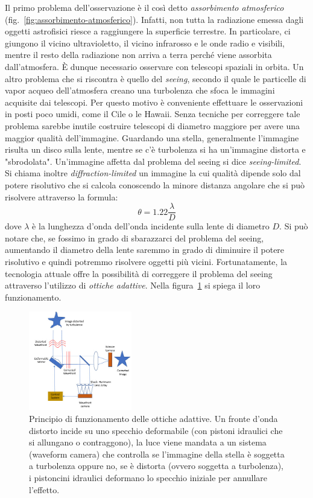 Il primo problema dell'osservazione è il così detto \emph{assorbimento atmosferico} (fig.~\ref{fig:assorbimento-atmosferico}). Infatti, non tutta la radiazione emessa dagli oggetti astrofisici riesce a raggiungere la superficie terrestre. In particolare, ci giungono il vicino ultravioletto, il vicino infrarosso e le onde radio e visibili, mentre il resto della radiazione non arriva a terra perché viene assorbita dall'atmosfera. È dunque necessario osservare con telescopi spaziali in orbita. Un altro problema che si riscontra è quello del \emph{seeing}, secondo il quale le particelle di vapor acqueo dell'atmosfera creano una turbolenza che sfoca le immagini acquisite dai telescopi. Per questo motivo è conveniente effettuare le osservazioni in posti poco umidi, come il Cile o le Hawaii. Senza tecniche per correggere tale problema sarebbe inutile costruire telescopi di diametro maggiore per avere una maggior qualità dell'immagine. Guardando una stella, generalmente l'immagine risulta un disco sulla lente, mentre se c'è turbolenza si ha un'immagine distorta e "sbrodolata". Un'immagine affetta dal problema del seeing si dice \emph{seeing-limited}. Si chiama inoltre \emph{diffraction-limited} un immagine la cui qualità dipende solo dal potere risolutivo che si calcola conoscendo la minore distanza angolare che si può risolvere attraverso la formula:
\[
    \theta = 1.22 \frac{\lambda}{D}
\]
dove $\lambda$ è la lunghezza d'onda dell'onda incidente sulla lente di diametro $D$. Si può notare che, se fossimo in grado di sbarazzarci del problema del seeing, aumentando il diametro della lente saremmo in grado di diminuire il potere risolutivo e quindi potremmo risolvere oggetti più vicini. Fortunatamente, la tecnologia attuale offre la possibilità di correggere il problema del seeing attraverso l'utilizzo di \emph{ottiche adattive}. Nella figura~\ref{fig:ottiche-adattive} si spiega il loro funzionamento. 

\begin{figure}
\centering
\includegraphics[width=0.4\textwidth]{immagini/ottiche-adattive.png}
\caption{Principio di funzionamento delle ottiche adattive. Un fronte d’onda distorto incide su uno specchio deformabile (con pistoni idraulici che si allungano o contraggono), la luce viene mandata a un sistema (waveform camera) che controlla se l’immagine della stella è soggetta a turbolenza oppure no, se è distorta (ovvero soggetta a turbolenza), i pistoncini idraulici deformano lo specchio iniziale per annullare l'effetto.}
\label{fig:ottiche-adattive}
\end{figure}

